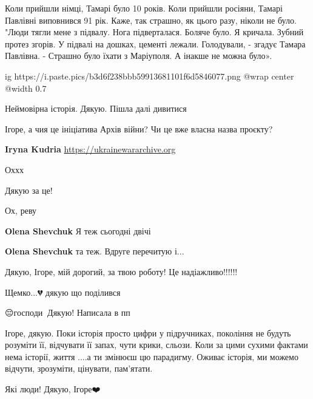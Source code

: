 Коли прийшли німці, Тамарі було 10 років. Коли прийшли росіяни, Тамарі Павлівні
виповнився 91 рік. Каже, так страшно, як цього разу, ніколи не було. "Люди
тягли мене з підвалу. Нога підверталася. Боляче було. Я кричала. Зубний протез
згорів. У підвалі на дошках, цементі лежали. Голодували, - згадує Тамара
Павлівна. - Страшно було їхати з Маріуполя. А інакше не можна було».

\ifcmt
  ig https://i.paste.pics/b3d6f238bbb59913681101f6d5846077.png
  @wrap center
  @width 0.7
\fi


Неймовірна історія. Дякую. Пішла далі дивитися


Ігоре, а чия це ініціатива Архів війни? Чи це вже власна назва проєкту?

\begin{itemize} %
\textbf{Iryna Kudria} \url{https://ukrainewararchive.org}
\end{itemize} %


Оххх


Дякую за це!


Ох, реву

\begin{itemize} %
\textbf{Olena Shevchuk} Я теж сьогодні двічі

\textbf{Olena Shevchuk} та теж. Вдруге перечитую і...
\end{itemize} %


Дякую, Ігоре, мій дорогий, за твою роботу! Це надіажливо!!!!!!


Щемко...💔 дякую що поділився


😔господи🙏🌅Дякую! Написала в пп


Ігоре, дякую. Поки історія просто цифри у підручниках, покоління не будуть
розуміти її, відчувати її запах, чути крики, сльози. Коли за цими сухими
фактами нема історії, життя ....а ти змінюєш цю парадигму. Оживає історія, ми
можемо відчути, зрозуміти, цінувати, пам'ятати.


Які люди! Дякую, Ігоре❤️

